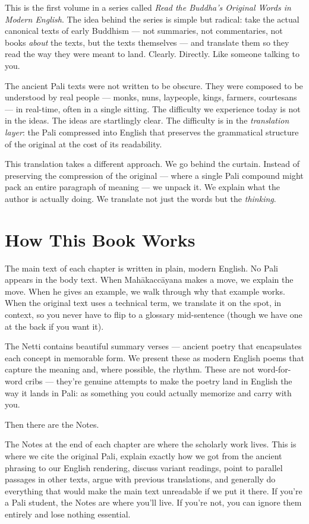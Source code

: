 This is the first volume in a series called \textit{Read the Buddha's Original Words in Modern English}. The idea behind the series is simple but radical: take the actual canonical texts of early Buddhism --- not summaries, not commentaries, not books \textit{about} the texts, but the texts themselves --- and translate them so they read the way they were meant to land. Clearly. Directly. Like someone talking to you.

The ancient Pali texts were not written to be obscure. They were composed to be understood by real people --- monks, nuns, laypeople, kings, farmers, courtesans --- in real-time, often in a single sitting. The difficulty we experience today is not in the ideas. The ideas are startlingly clear. The difficulty is in the \textit{translation layer}: the Pali compressed into English that preserves the grammatical structure of the original at the cost of its readability.

This translation takes a different approach. We go behind the curtain. Instead of preserving the compression of the original --- where a single Pali compound might pack an entire paragraph of meaning --- we unpack it. We explain what the author is actually doing. We translate not just the words but the \textit{thinking}.

\section*{How This Book Works}

The main text of each chapter is written in plain, modern English. No Pali appears in the body text. When Mahākaccāyana makes a move, we explain the move. When he gives an example, we walk through why that example works. When the original text uses a technical term, we translate it on the spot, in context, so you never have to flip to a glossary mid-sentence (though we have one at the back if you want it).

The Netti contains beautiful summary verses --- ancient poetry that encapsulates each concept in memorable form. We present these as modern English poems that capture the meaning and, where possible, the rhythm. These are not word-for-word cribs --- they're genuine attempts to make the poetry land in English the way it lands in Pali: as something you could actually memorize and carry with you.

Then there are the Notes.

The Notes at the end of each chapter are where the scholarly work lives. This is where we cite the original Pali, explain exactly how we got from the ancient phrasing to our English rendering, discuss variant readings, point to parallel passages in other texts, argue with previous translations, and generally do everything that would make the main text unreadable if we put it there. If you're a Pali student, the Notes are where you'll live. If you're not, you can ignore them entirely and lose nothing essential.

